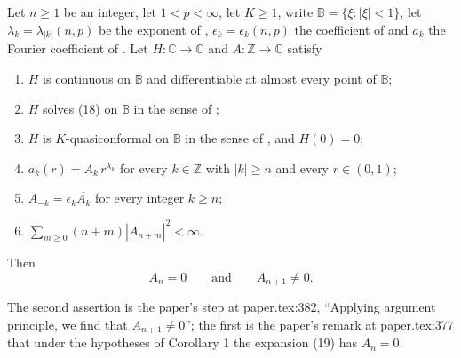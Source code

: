 \begin{lemma}
Let $n\ge1$ be an integer, let $1<p<\infty$, let $K\ge1$, write
$\mathbb{B}=\{\xi:|\xi|<1\}$, let $\lambda_k=\lambda_{|k|}(n,p)$ be the
exponent of , $\epsilon_k=\epsilon_k(n,p)$ the coefficient
of  and $a_k$ the Fourier coefficient of
.  Let $H\colon\mathbb{C}\to\mathbb{C}$ and
$A\colon\mathbb{Z}\to\mathbb{C}$ satisfy
\begin{enumerate}
\item[(H1)] $H$ is continuous on $\mathbb{B}$ and differentiable at almost
  every point of $\mathbb{B}$;
\item[(H2)] $H$ solves (18) on $\mathbb{B}$ in the sense of
  ;
\item[(H3)] $H$ is $K$-quasiconformal on $\mathbb{B}$ in the sense of
  , and $H(0)=0$;
\item[(H4)] $a_k(r)=A_k\,r^{\lambda_k}$ for every $k\in\mathbb{Z}$ with
  $|k|\ge n$ and every $r\in(0,1)$;
\item[(H5)] $A_{-k}=\epsilon_k\overline{A_k}$ for every integer $k\ge n$;
\item[(H6)] $\sum_{m\ge0}(n+m)|A_{n+m}|^2<\infty$.
\end{enumerate}
Then
\[
  A_n=0\qquad\text{and}\qquad A_{n+1}\neq0 .
\]

The second assertion is the paper's step at paper.tex:382, ``Applying argument
principle, we find that $A_{n+1}\neq0$''; the first is the paper's remark at
paper.tex:377 that under the hypotheses of Corollary 1 the expansion (19) has
$A_n=0$.
\end{lemma}
